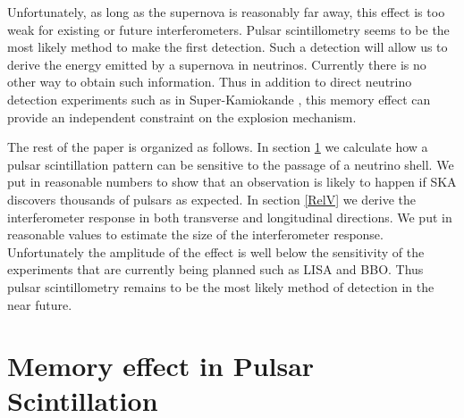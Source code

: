 \documentclass[aps,showpacs,onecolumn,floats,prd,superscriptaddress,nofootinbib]{revtex4-1}
\begin{document}
Unfortunately, as long as the supernova is reasonably far away, this effect is too weak for existing or future interferometers. 
Pulsar scintillometry seems to be the most likely method to make the first detection. 
Such a detection will allow us to derive the energy emitted by a supernova in neutrinos. 
Currently there is no other way to obtain such information. 
Thus in addition to direct neutrino detection experiments such as in Super-Kamiokande \cite{SuperKSN}, this memory effect can provide an independent constraint on the explosion mechanism.

The rest of the paper is organized as follows. 
In section \ref{sec-scint} we calculate how a pulsar scintillation pattern can be sensitive to the passage of a neutrino shell.
We put in reasonable numbers to show that an observation is likely to happen if SKA discovers thousands of pulsars as expected.
In section \ref{RelV} we derive the interferometer response in both transverse and longitudinal directions.  
We put in reasonable values to estimate the size of the interferometer response.
Unfortunately the amplitude of the effect is well below the sensitivity of the experiments that are currently being planned such as LISA and BBO.
Thus pulsar scintillometry remains to be the most likely method of detection in the near future.

\section{Memory effect in Pulsar Scintillation}
\label{sec-scint}
\end{document}
